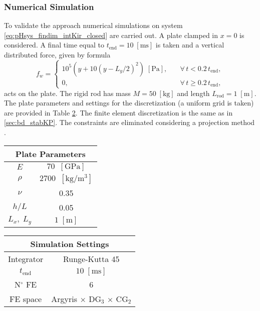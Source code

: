 \subsubsection{Numerical Simulation}
To validate the approach numerical simulations on system \eqref{eq:pHsys_findim_intKir_closed} are carried out. A  plate clamped in $x=0$ is considered. A final time equal to $t_{\text{end}} = 10 \; \mathrm{[ms]}$ is taken and a vertical distributed force, given by formula
\begin{equation}\label{eq:force_rod}
f_w = \begin{cases}
10^5 \left( y + 10 \left( y - L_y/2 \right)^2 \right) \; \mathrm{[Pa]}, \quad &\forall \, t < 0.2 \, t_{\text{end}}, \\
0, \quad &\forall \, t \ge 0.2 \, t_{\text{end}},
\end{cases}
\end{equation}
acts on the plate. The rigid rod has mass $M = 50 \; \mathrm{[kg]}$ and length $L_{\text{rod}} = 1 \; \mathrm{[m]}$. The plate parameters and settings for the discretization (a uniform grid is taken) are provided in Table \ref{tab:parKirInt}. The finite element discretization is the same as in \ref{sec:bd_stabKP}.  The constraints are eliminated considering a projection method \cite{benner2015time}.

\begin{table}[hbt]
	\centering
	\begin{tabular}{|c|c|}
		\hline 
		\multicolumn{2}{|c|}{Plate Parameters} \\ 
		\hline 
		$E$ & $70\; \; \mathrm{[GPa]}$ \\ 
		$\rho$ & $2700\; \; \mathrm{[kg / m^3]}$ \\ 
		$\nu$& 0.35 \\ 
		$h/L$& 0.05 \\ 
		$L_x, \; L_y$& $1\;  \mathrm{[m]}$\\ 
		\hline 
	\end{tabular} \hspace{1cm}
	\begin{tabular}{|c|c|}
		\hline 
		\multicolumn{2}{|c|}{Simulation Settings} \\ 
		\hline 
		Integrator & Runge-Kutta 45 \\
		$t_{\text{end}}$ & $10 \; \mathrm{[ms]}$\\
		N$^\circ$ FE & 6 \\
		FE space & Argyris $\times$ DG$_3$ $\times$ CG$_2$\\
		\hline 
	\end{tabular} 
	\captionsetup{width=0.95\linewidth}
	\vspace{1mm}
	\label{tab:parKirInt}
\end{table}

